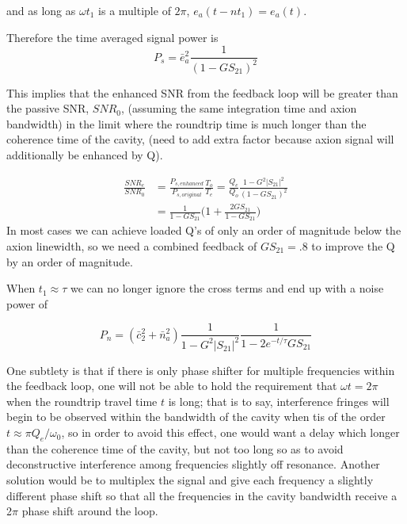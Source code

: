 \documentclass[aps,prl,twocolumn,groupedaddress]{revtex4-1}
\begin{document}
and as long as $\omega t_1$ is a multiple of $2\pi$, $e_a(t-nt_1) = e_a(t)$.

Therefore the time averaged signal power is
\begin{equation}
P_s = \bar{e}_a^2\frac{1}{(1 - GS_{21})^2}
\end{equation}

This implies that the enhanced SNR from the feedback loop will be greater than the passive SNR, $SNR_0$, (assuming the same integration time and axion bandwidth) in the limit where the roundtrip time is much longer than the coherence time of the cavity, (need to add extra factor because axion signal will additionally be enhanced by Q).

\begin{align}
\frac{SNR_{e}}{SNR_{0}} &=\frac{P_{s, enhanced}}{P_{s,original}}\frac{T_o}{T_e} = \frac{Q_e}{Q_o}\frac{1-G^2|S_{21}|^2}{(1-GS_{21})^2} 
\\ &= \frac{1}{1-GS_{21}}\bigg(1 + \frac{2GS_{21}}{1-GS_{21}}\bigg)
\end{align}
In most cases we can achieve loaded Q's of only an order of magnitude below the axion linewidth, so we need a combined feedback of $GS_{21} = .8$ to improve the Q by an order of magnitude.

When $t_1 \approx \tau$ we can no longer ignore the cross terms and end up with a noise power of

\begin{equation}
P_n = (\bar{c}_2^2 + \bar{n}_a^2)\frac{1}{1 - G^2|S_{21}|^2}\frac{1}{1-2e^{-t/\tau}GS_{21}}
\end{equation}

One subtlety is that if there is only phase shifter for multiple frequencies within the feedback loop, one will not be able to hold the requirement that $\omega t = 2\pi$ when the roundtrip travel time $t$ is long; that is to say, interference fringes will begin to be observed within the bandwidth of the cavity when tis of the order $t \approx \pi Q_e / \omega_0$, so in order to avoid this effect, one would want a delay which longer than the coherence time of the cavity, but not too long so as to avoid deconstructive interference among frequencies slightly off resonance. Another solution would be to multiplex the signal and give each frequency a slightly different phase shift so that all the frequencies in the cavity bandwidth receive a 2$\pi$ phase shift around the loop.
\end{document}
